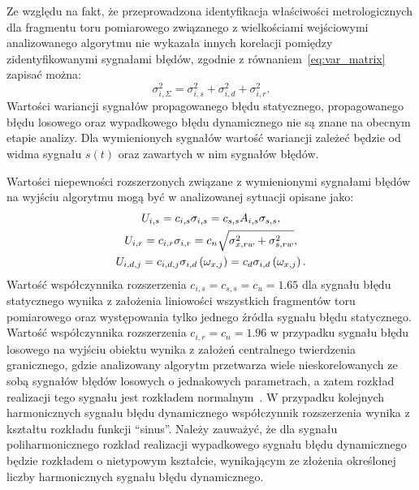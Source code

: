 Ze względu na fakt, że przeprowadzona identyfikacja właściwości metrologicznych dla fragmentu toru pomiarowego związanego z wielkościami wejściowymi analizowanego algorytmu nie wykazała innych korelacji pomiędzy zidentyfikowanymi sygnałami błędów, zgodnie z równaniem~\eqref{eq:var_matrix} zapisać można:
\begin{equation}
\sigma_{i,\Sigma}^{2} = \sigma_{i,s}^{2} + \sigma_{i,d}^{2} + \sigma_{i,r}^{2} \label{eq:pom_varout_sum}.
\end{equation}
Wartości wariancji sygnałów propagowanego błędu statycznego, propagowanego błędu losowego oraz wypadkowego błędu dynamicznego nie są znane na obecnym etapie analizy. Dla wymienionych sygnałów wartość wariancji zależeć będzie od widma sygnału $s(t)$ oraz zawartych w nim sygnałów błędów.

Wartości niepewności rozszerzonych związane z wymienionymi sygnałami błędów na wyjściu algorytmu mogą być w analizowanej sytuacji opisane jako:
\begin{gather}
U_{i,s} = c_{i,s} \sigma_{i,s} = c_{s,s} A_{i,s} \sigma_{s,s} \label{eq:pom_uncout_stat}, \\
U_{i,r} = c_{i,r} \sigma_{i,r} = c_{n} \sqrt{\sigma_{x,rw}^{2} + \sigma_{s,rw}^{2}} \label{eq:pom_uncout_rand}, \\
U_{i,d,j} = c_{i,d,j} \sigma_{i,d} \left(\omega_{x,j}\right) = c_{d} \sigma_{i,d} \left(\omega_{x,j}\right) \label{eq:pom_uncout_dyn}.
\end{gather}
Wartość współczynnika rozszerzenia $c_{i,s} = c_{s,s} = c_{u} = \num{1.65}$ dla sygnału błędu statycznego wynika z założenia liniowości wszystkich fragmentów toru pomiarowego oraz występowania tylko jednego źródła sygnału błędu statycznego. Wartość współczynnika rozszerzenia $c_{i,r} = c_{n} = \num{1.96}$ w przypadku sygnału błędu losowego na wyjściu obiektu wynika z założeń centralnego twierdzenia granicznego, gdzie analizowany algorytm przetwarza wiele nieskorelowanych ze sobą sygnałów błędów losowych o jednakowych parametrach, a zatem rozkład realizacji tego sygnału jest rozkładem normalnym~\cite{jcgm_guide}. W przypadku kolejnych harmonicznych sygnału błędu dynamicznego współczynnik rozszerzenia wynika z kształtu rozkładu funkcji \enquote{sinus}. Należy zauważyć, że dla sygnału poliharmonicznego rozkład realizacji wypadkowego sygnału błędu dynamicznego będzie rozkładem o nietypowym kształcie, wynikającym ze złożenia określonej liczby harmonicznych sygnału błędu dynamicznego.

